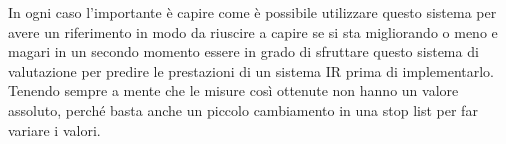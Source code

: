 In ogni caso l'importante è capire come è possibile utilizzare questo sistema per avere un riferimento in modo da riuscire a capire se si sta migliorando o meno e magari in un secondo momento essere in grado di sfruttare questo sistema di valutazione per predire le prestazioni di un sistema IR prima di implementarlo. 
Tenendo sempre a mente che le misure così ottenute non hanno un valore assoluto, perché basta anche un piccolo cambiamento in una stop list per far variare i valori.






